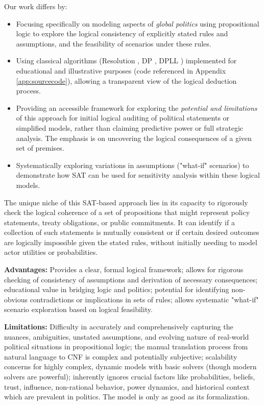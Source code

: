 \documentclass[11pt, a4paper]{article}
\begin{document}
Our work differs by:
\begin{itemize}
    \item Focusing specifically on modeling aspects of \textit{global politics} using propositional logic to explore the logical consistency of explicitly stated rules and assumptions, and the feasibility of scenarios under these rules.
    \item Using classical algorithms (Resolution \cite{Robinson1965}, DP \cite{DavisPutnam1960}, DPLL \cite{DPLL1962}) implemented for educational and illustrative purposes (code referenced in Appendix \ref{app:sourcecode}), allowing a transparent view of the logical deduction process.
    \item Providing an accessible framework for exploring the \textit{potential and limitations} of this approach for initial logical auditing of political statements or simplified models, rather than claiming predictive power or full strategic analysis. The emphasis is on uncovering the logical consequences of a given set of premises.
    \item Systematically exploring variations in assumptions ("what-if" scenarios) to demonstrate how SAT can be used for sensitivity analysis within these logical models.
\end{itemize}

The unique niche of this SAT-based approach lies in its capacity to rigorously check the logical coherence of a set of propositions that might represent policy statements, treaty obligations, or public commitments. It can identify if a collection of such statements is mutually consistent or if certain desired outcomes are logically impossible given the stated rules, without initially needing to model actor utilities or probabilities.

\textbf{Advantages:} Provides a clear, formal logical framework; allows for rigorous checking of consistency of assumptions and derivation of necessary consequences; educational value in bridging logic and politics; potential for identifying non-obvious contradictions or implications in sets of rules; allows systematic "what-if" scenario exploration based on logical feasibility.

\textbf{Limitations:} Difficulty in accurately and comprehensively capturing the nuances, ambiguities, unstated assumptions, and evolving nature of real-world political situations in propositional logic; the manual translation process from natural language to CNF is complex and potentially subjective; scalability concerns for highly complex, dynamic models with basic solvers (though modern solvers are powerful); inherently ignores crucial factors like probabilities, beliefs, trust, influence, non-rational behavior, power dynamics, and historical context which are prevalent in politics. The model is only as good as its formalization.
\end{document}
